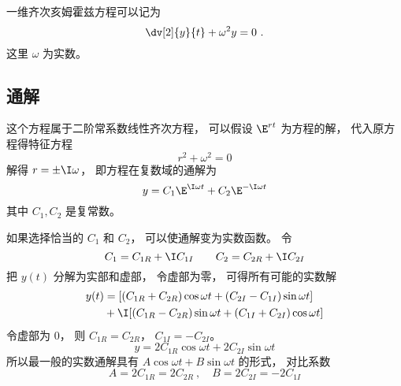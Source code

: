 
\begin{issues}
\issueNeedCite
\end{issues}


一维齐次亥姆霍兹方程可以记为
\begin{equation}
\dv[2]{y}{t} + \omega^2 y = 0~.
\end{equation}
这里 $\omega$ 为实数。

\subsection{通解}
这个方程属于二阶常系数线性齐次方程， 可以假设 $\E^{rt}$ 为方程的解， 代入原方程得特征方程
\begin{equation}
r^2 + \omega^2 = 0
\end{equation}
解得 $r = \pm \I \omega$， 即方程在复数域的通解为
\begin{equation}
y = C_1 \E^{\I\omega t} + C_2 \E^{-\I\omega t}
\end{equation}
其中 $C_1, C_2$ 是复常数。

如果选择恰当的 $C_1$ 和 $C_2$， 可以使通解变为实数函数。 令
\begin{equation}
C_1 = C_{1R} + \I C_{1I} \qquad
C_2 = C_{2R} + \I C_{2I}
\end{equation}
把 $y(t)$ 分解为实部和虚部， 令虚部为零， 可得所有可能的实数解
\begin{equation}\label{eq_HmhzEq_1}
\begin{aligned}
y(t) &= [(C_{1R} + C_{2R}) \cos\omega t + (C_{2I} - C_{1I}) \sin\omega t] \\
& + \I [(C_{1R} - C_{2R}) \sin \omega t + (C_{1I} + C_{2I}) \cos \omega t]
\end{aligned}
\end{equation}
令虚部为 $0$， 则 $C_{1R} = C_{2R}$， $C_{1I} = -C_{2I}$。
\begin{equation}
y = 2C_{1R}\cos\omega t + 2C_{2I}\sin\omega t
\end{equation}
所以最一般的实数通解具有 $A\cos\omega t + B\sin\omega t$ 的形式， 对比系数
\begin{equation}
A = 2C_{1R} = 2C_{2R}~,\quad B = 2C_{2I} = -2C_{1I}
\end{equation}
